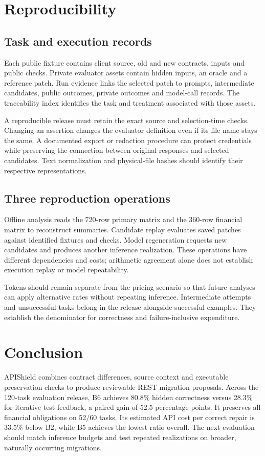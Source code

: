 \ifAccess
\section{Reproducibility}
\subsection{Task and execution records}
Each public fixture contains client source, old and new contracts, inputs and public checks. Private evaluator assets contain hidden inputs, an oracle and a reference patch. Run evidence links the selected patch to prompts, intermediate candidates, public outcomes, private outcomes and model-call records. The traceability index identifies the task and treatment associated with those assets.

A reproducible release must retain the exact source and selection-time checks. Changing an assertion changes the evaluator definition even if its file name stays the same. A documented export or redaction procedure can protect credentials while preserving the connection between original responses and selected candidates. Text normalization and physical-file hashes should identify their respective representations.

\subsection{Three reproduction operations}
Offline analysis reads the 720-row primary matrix and the 360-row financial matrix to reconstruct summaries. Candidate replay evaluates saved patches against identified fixtures and checks. Model regeneration requests new candidates and produces another inference realization. These operations have different dependencies and costs; arithmetic agreement alone does not establish execution replay or model repeatability.

Tokens should remain separate from the pricing scenario so that future analyses can apply alternative rates without repeating inference. Intermediate attempts and unsuccessful tasks belong in the release alongside successful examples. They establish the denominator for correctness and failure-inclusive expenditure.

\fi

\section{Conclusion}
APIShield combines contract differences, source context and executable preservation checks to produce reviewable REST migration proposals. Across the 120-task evaluation release, B6 achieves 80.8\% hidden correctness versus 28.3\% for iterative test feedback, a paired gain of 52.5 percentage points. It preserves all financial obligations on 52/60 tasks. Its estimated API cost per correct repair is 33.5\% below B2, while B5 achieves the lowest ratio overall. The next evaluation should match inference budgets and test repeated realizations on broader, naturally occurring migrations.
